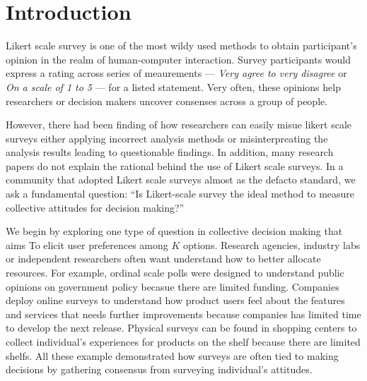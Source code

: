 \section{Introduction}
Likert scale survey 
is one of the most wildy used methods
to obtain participant's opinion
in the realm of human-computer interaction.
Survey participants would express
a rating across series of meaurements ---
\textit{Very agree to very disagree} or
\textit{On a scale of 1 to 5} ---
for a listed statement.
Very often, 
these opinions help
researchers or decision makers
uncover consenses 
across a group of people.

However, there had been finding of
how researchers can 
easily misue likert scale surveys
either applying incorrect analysis methods 
\cite{bishop2015use} 
or misinterpreating the analysis results
\cite{jamieson2004likert, pell2005use}
leading to questionable findings.
In addition, 
many research papers
do not explain the rational
behind the use of 
Likert scale surveys.
In a community that adopted Likert scale surveys
almost as the defacto standard,
we ask a fundamental question: 
``Is Likert-scale survey the ideal method
to measure collective attitudes for decision making?''

We begin by exploring one type of question
in collective decision making that aims To
elicit user preferences among $K$ options.
Research agencies, industry labs or independent researchers
often want understand how to better allocate resources.
For example, 
ordinal scale polls were designed
to understand public opinions
on government policy \cite{pew}
becasue there are limited funding.
Companies deploy online surveys 
to understand how product users 
feel about the features and services
that needs further improvements
because companies has limited time 
to develop the next release.
Physical surveys can be found 
in shopping centers 
to collect individual's experiences
for products on the shelf
because there are limited shelfs.
All these example demonstrated
how surveys are often tied to 
making decisions 
by gathering consensus
from surveying individual's attitudes.

